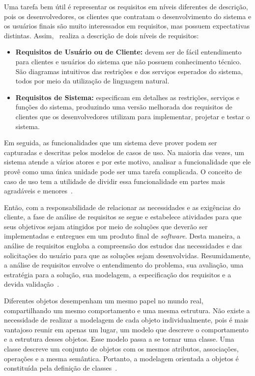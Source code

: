 Uma tarefa bem útil é representar os requisitos em níveis diferentes de descrição, pois os desenvolvedores, os clientes que contratam o desenvolvimento do sistema e os usuários finais são muito interessados em requisitos, mas possuem expectativas distintas. Assim,~ realiza a descrição de dois níveis de requisitos:

\begin{itemize}
	\item \textbf{Requisitos de Usuário ou de Cliente:} devem ser de fácil entendimento para clientes e usuários do sistema que não possuem conhecimento técnico. São diagramas intuitivos das restrições e dos serviços esperados do sistema, todos por meio da utilização de linguagem natural.
	
	\item \textbf{Requisitos de Sistema:} especificam em detalhes as restrições, serviços e funções do sistema, produzindo uma versão melhorada dos requisitos de clientes que os desenvolvedores utilizam para implementar, projetar e testar o sistema. 
\end{itemize}

Em seguida, as funcionalidades que um sistema deve prover podem ser capturadas e descritas pelos modelos de casos de uso. Na maioria das vezes, um sistema atende a vários atores e por este motivo, analisar a funcionalidade que ele provê como uma única unidade pode ser uma tarefa complicada. O conceito de caso de uso tem a utilidade de dividir essa funcionalidade em partes mais agradáveis e menores~\cite{olive:cmis07}.

Então, com a responsabilidade de relacionar as necessidades e as exigências do cliente, a fase de análise de requisitos se segue e estabelece atividades para que seus objetivos sejam atingidos por meio de soluções que deverão ser implementadas e entregues em um produto final de \textit{software}. Desta maneira, a análise de requisitos engloba a compreensão dos estudos das necessidades e das solicitações do usuário para que as soluções sejam desenvolvidas. Resumidamente, a análise de requisitos envolve o entendimento do problema, sua avaliação, uma estratégia para a solução, sua modelagem, a especificação dos requisitos e a devida validação~\cite{amui:pds15}.

Diferentes objetos desempenham um mesmo papel no mundo real, compartilhando um mesmo comportamento e uma mesma estrutura. Não existe a necessidade de realizar a modelagem de cada objeto individualmente, pois é mais vantajoso reunir em apenas um lugar, um modelo que descreve o comportamento e a estrutura desses objetos. Esse modelo passa a se tornar uma classe. Uma classe descreve um conjunto de objetos com os mesmos atributos, associações, operações e a mesma semântica. Portanto, a modelagem orientada a objetos é constituída pela definição de classes~\cite{falbo:er17}.

